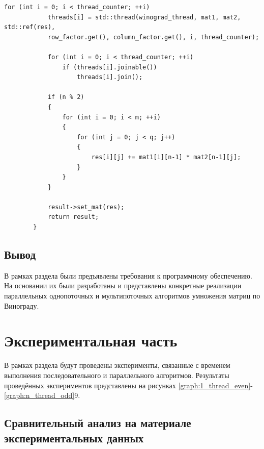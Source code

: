 \documentclass[a4paper,12pt]{report}
\begin{document}
\begin{lstlisting}[frame = single, breaklines, caption = Параллельный алгоритм Винограда, label=list:par_wino]
	        for (int i = 0; i < thread_counter; ++i)
	        threads[i] = std::thread(winograd_thread, mat1, mat2, std::ref(res),
	        row_factor.get(), column_factor.get(), i, thread_counter);
	        	
	        for (int i = 0; i < thread_counter; ++i)
	        	if (threads[i].joinable())
	        		threads[i].join();
	        	
	        if (n % 2)
	        {
	        	for (int i = 0; i < m; ++i)
	        	{
	        		for (int j = 0; j < q; j++)
	        		{
	        			res[i][j] += mat1[i][n-1] * mat2[n-1][j];
	        		}
	        	}
	        }
	        	
	        result->set_mat(res);
	        return result;
	    }
        	\end{lstlisting}
        	
    \section{Вывод}
    
    	В рамках раздела были предъявлены требования к программному обеспечению. 
    	На основании их были разработаны и представлены конкретные реализации параллельных однопоточных и мультипоточных алгоритмов умножения матриц по Винограду.

    \newpage

    \chapter{Экспериментальная часть}
        \label{sec:experimental_part}

        	В рамках раздела будут проведены эксперименты, связанные с временем выполнения последовательного и параллельного алгоритмов. 
        	Результаты проведённых экспериментов представлены на рисунках \ref{graph:1_thread_even}-\ref{graph:n_thread_odd}9.

	\section{Сравнительный анализ на материале экспериментальных данных}
\end{document}
